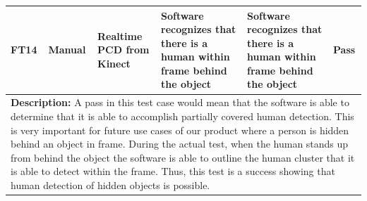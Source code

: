 \documentclass[12pt, titlepage]{article}
\begin{document}
\begin{table}[H]
{\begin{tabular}{|p{1.5cm}|p{2.5cm}|p{3cm}|p{4cm}|p{4cm}|p{1.8cm}|}
      \hline
      FT14 & Manual & \raggedright Realtime PCD from Kinect & \raggedright Software recognizes that there is a human within frame behind the object & \raggedright Software recognizes that there is a human within frame behind the object & Pass \\
      \hline
      \multicolumn{6}{|p{\textwidth}|}{\raggedright \textbf{Description:} A pass in this test case would mean that the software is able to determine that it is able to accomplish partially covered human detection. This is very important for future use cases of our product where a person is hidden behind an object in frame. During the actual test, when the human stands up from behind the object the software is able to outline the human cluster that it is able to detect within the frame. Thus, this test is a success showing that human detection of hidden objects is possible.} \\
      \hline
  \end{tabular}
  }
\end{table}
\end{document}
